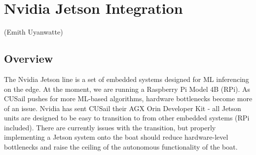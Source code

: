 \documentclass{article}
\begin{document}
\section{Nvidia Jetson Integration}
(Emith Uyanwatte)
\subsection{Overview}
The Nvidia Jetson line is a set of embedded systems designed for ML inferencing on the edge. At the moment, we are running a Raspberry Pi Model 4B (RPi). As CUSail pushes for more ML-based algorithms, hardware bottlenecks become more of an issue. Nvidia has sent CUSail their AGX Orin Developer Kit - all Jetson units are designed to be easy to transition to from other embedded systems (RPi included). There are currently issues with the transition, but properly implementing a Jetson system onto the boat should reduce hardware-level bottlenecks and raise the ceiling of the autonomous functionality of the boat.
\end{document}
